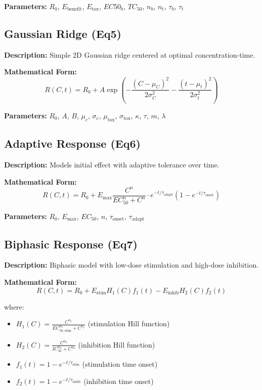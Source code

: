 \documentclass[11pt,a4paper]{article}
\begin{document}
\textbf{Parameters:} $R_0$, $E_{\mathrm{benefit}}$, $E_{\mathrm{tox}}$, $EC50_b$, $TC_{50}$, $n_b$, $n_t$, $\tau_b$, $\tau_t$


\subsection{Gaussian Ridge (Eq5)}

\textbf{Description:} Simple 2D Gaussian ridge centered at optimal concentration-time.

\textbf{Mathematical Form:}
\begin{equation}
R(C,t) = R_0 + A \exp\left(-\frac{(C-\mu_C)^2}{2\sigma_C^2} - \frac{(t-\mu_t)^2}{2\sigma_t^2}\right)
\end{equation}

\textbf{Parameters:} $R_0$, $A$, $B$, $\mu_c$, $\sigma_c$, $\mu_{\mathrm{tox}}$, $\sigma_{\mathrm{tox}}$, $\kappa$, $\tau$, $m$, $\lambda$


\subsection{Adaptive Response (Eq6)}

\textbf{Description:} Models initial effect with adaptive tolerance over time.

\textbf{Mathematical Form:}
\begin{equation}
R(C,t) = R_0 + E_{\mathrm{max}} \frac{C^n}{EC_{50}^n + C^n} \cdot e^{-t/\tau_{\mathrm{adapt}}} (1-e^{-t/\tau_{\mathrm{onset}}})
\end{equation}

\textbf{Parameters:} $R_0$, $E_{\mathrm{max}}$, $EC_{50}$, $n$, $\tau_{\mathrm{onset}}$, $\tau_{\mathrm{adapt}}$


\subsection{Biphasic Response (Eq7)}

\textbf{Description:} Biphasic model with low-dose stimulation and high-dose inhibition.

\textbf{Mathematical Form:}
\begin{equation}
R(C,t) = R_0 + E_{\mathrm{stim}} H_1(C) f_1(t) - E_{\mathrm{inhib}} H_2(C) f_2(t)
\end{equation}

where:
\begin{itemize}
\item $H_1(C) = \frac{C^{n_1}}{EC_{50,\mathrm{stim}}^{n_1} + C^{n_1}}$ (stimulation Hill function)
\item $H_2(C) = \frac{C^{n_2}}{IC_{50}^{n_2} + C^{n_2}}$ (inhibition Hill function)
\item $f_1(t) = 1 - e^{-t/\tau_{\mathrm{stim}}}$ (stimulation time onset)
\item $f_2(t) = 1 - e^{-t/\tau_{\mathrm{inhib}}}$ (inhibition time onset)
\end{itemize}
\end{document}
